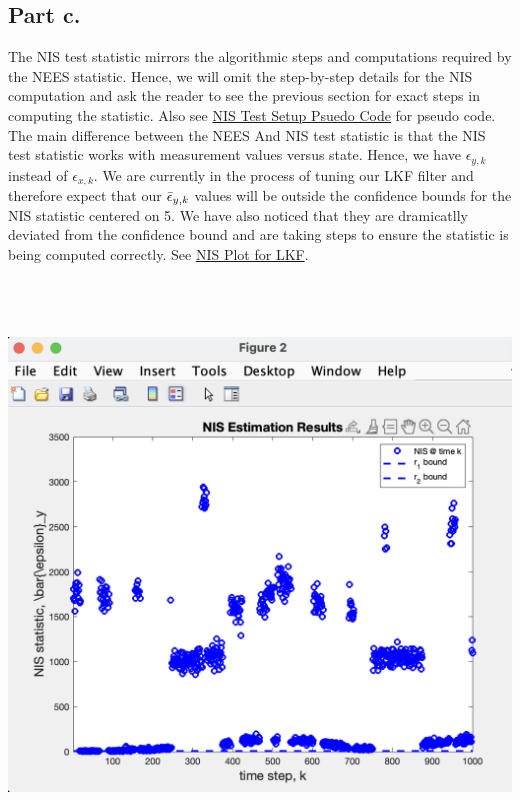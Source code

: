 \documentclass[paper=a4, fontsize=11pt]{scrartcl} %
\numberwithin{equation}{section} %
\numberwithin{figure}{section} %
\numberwithin{table}{section} %
\begin{document}
\begin{framed}
\subsection{Part c.}
The NIS test statistic mirrors the algorithmic steps and computations required by the NEES statistic.  Hence, we will omit the step-by-step details for the NIS computation and ask the reader to see the previous section for exact steps in computing the statistic.  Also see \hyperref[alg:TMT_nis_algo]{NIS Test Setup Psuedo Code} for pseudo code.  The main difference between the NEES And NIS test statistic is that the NIS test statistic works with measurement values versus state.  Hence, we have $\epsilon_{y,k}$ instead of $\epsilon_{x,k}$.
\newline
We are currently in the process of tuning our LKF filter and therefore expect that our $\Bar{\epsilon}_{y,k}$ values will be outside the confidence bounds for the NIS statistic centered on 5.  We have also noticed that they are dramicatlly deviated from the confidence bound and are taking steps to ensure the statistic is being computed correctly.  See \hyperref[fig:nis_plot_lkf]{NIS Plot for LKF}.
\\~\\
\\~\\
\begin{minipage}[t]{1\linewidth}
   \vspace{-2ex}
   \centering
   \includegraphics[scale=0.55]{NIS_LKF_plot.png}
   \label{fig:nis_plot_lkf}
\end{minipage}


\end{framed}
\end{document}
